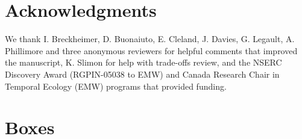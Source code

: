 \documentclass[11pt,letterpaper]{article}
\begin{document}
\section{Acknowledgments}
We thank I. Breckheimer, D. Buonaiuto, E. Cleland, J. Davies, G. Legault, A. Phillimore and three anonymous reviewers for helpful comments that improved the manuscript, K. Slimon for help with trade-offs review, and the NSERC Discovery Award (RGPIN-05038 to EMW) and Canada Research Chair in Temporal Ecology (EMW) programs that provided funding. 






\newpage
\section{Boxes}
\end{document}
